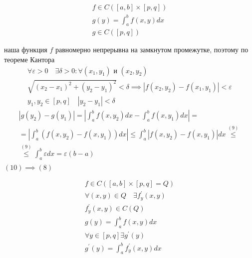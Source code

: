 \documentclass[main]{subfiles}
\begin{document}
     \begin{theorem}
          \begin{gather*}
               f \in C([a,b] \times [p,q]) \\ 
               g(y) = \int^b_a f(x,y) dx \tag{7} \\
               g \in C([p,q]) \tag{8} \end{gather*}
     \end{theorem}
     \begin{longProof}
               наша функция $f$  равномерно непрерывна на замкнутом промежутке, поэтому по теореме Кантора 
               \begin{gather*}
               \forall \varepsilon > 0 \quad \exists \delta > 0 : \forall (x_1,y_1) \text{ и } (x_2,y_2) \\
               \sqrt{(x_2-x_1)^2 + (y_2-y_1)^2} < \delta \implies |f(x_2,y_2) - f(x_1,y_1)  | < \varepsilon \tag{9} \\
               y_1,y_2 \in [p,q] \quad |y_2 - y_1| < \delta 
          \end{gather*}
          \begin{multline*}
               |g(y_2) - g(y_1)| = \left | \int^b_a f(x,y_2) dx - \int^b_a f(x,y_1)dx \right | = \\
               = \left | \int^b_a (f(x,y_2) - f(x,y_1))dx \right | \leq \int^b_a |f(x,y_2) - f(x,y_1)|dx \stackrel{(9)}{\leq} \\
               \stackrel{(9)}{\leq}  \int^b_a \varepsilon dx = \varepsilon(b-a) \tag{10} \\
                  \end{multline*}
                  $(10) \implies (8) $
     \end{longProof}
     \begin{theorem}
          \begin{gather*}
               f \in C([a,b] \times [p,q] = Q) \\
               \forall (x,y) \in Q \quad \exists f^\prime_y(x,y) \\
               f^\prime_y(x,y) \in C(Q) \tag{11} \\
               g(y) = \int^b_a f(x,y) dx \\
               \forall y \in [p,q] \exists g^\prime(y) \\
               g^\prime(y) = \int^b_a f^\prime_y(x,y)dx \tag{12} 
          \end{gather*}
     \end{theorem}
\end{document}
